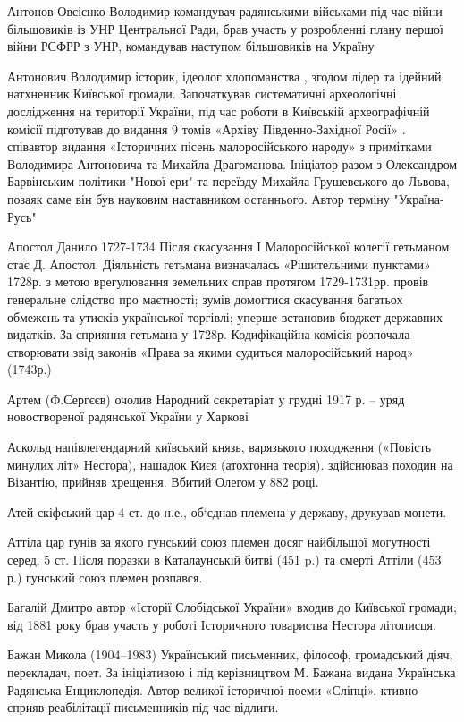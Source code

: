 Антонов-Овсієнко Володимир командувач радянськими військами під час війни більшовиків із УНР Центральної Ради, брав участь у розробленні плану першої війни РСФРР з УНР, командував наступом більшовиків на Україну 

Антонович Володимир історик, ідеолог хлопоманства , згодом лідер та ідейний натхненник Київської громади. Започаткував систематичні археологічні дослідження на території України, під час роботи в Київській археографічній комісії підготував до видання 9 томів «Архіву Південно-Західної Росії» . співавтор видання «Історичних пісень малоросійського народу» з примітками Володимира Антоновича та Михайла Драгоманова.  Ініціатор разом з Олександром Барвінським політики "Нової ери" та переїзду Михайла Грушевського до Львова, позаяк саме він був науковим наставником останнього. Автор терміну "Україна-Русь" 

Апостол Данило  1727-1734 Після скасування І Малоросійської колегії гетьманом стає Д. Апостол. Діяльність гетьмана визначалась «Рішительними пунктами» 1728р. з метою врегулювання земельних справ протягом 1729-1731рр. провів генеральне слідство про маєтності; зумів домогтися скасування багатьох обмежень та утисків української торгівлі; уперше встановив бюджет державних видатків. За сприяння гетьмана у 1728р. Кодифікаційна комісія розпочала створювати звід законів «Права за якими судиться малоросійський народ» (1743р.)

Артем (Ф.Сергєєв) очолив Народний секретаріат у грудні 1917 р. – уряд новоствореної радянської України у Харкові

Аскольд напівлегендарний київський князь, варязького походження («Повість минулих літ» Нестора), нашадок Києя (атохтонна теорія). здійснював походин на Візантію, прийняв хрещення. Вбитий Олегом у 882 році.

Атей скіфський цар 4 ст. до н.е., об‘єднав племена у державу, друкував монети.

Аттіла цар гунів за якого гунський союз племен досяг найбільшої могутності серед. 5 ст. Після поразки в Каталаунській битві (451 p.) та смерті Аттіли (453 р.) гунський союз племен розпався.

Багалій Дмитро автор «Історії Слобідської України» входив до Київської громади; від 1881 року брав участь у роботі Історичного товариства Нестора літописця.   

Бажан Микола (1904–1983) Український письменник, філософ, громадський діяч, перекладач, поет. За ініціативою і під керівництвом М. Бажана видана Українська Радянська Енциклопедія. Автор великої історичної поеми «Сліпці». ктивно сприяв реабілітації письменників під час відлиги.

